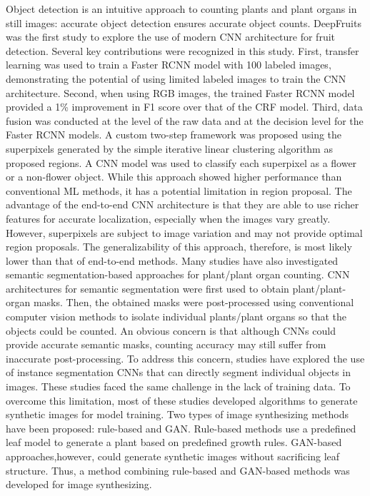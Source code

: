Object detection is an intuitive approach to counting plants and plant organs in still images: accurate object detection ensures accurate object counts.
DeepFruits was the first study to explore the use of modern CNN architecture for fruit detection. Several key contributions were recognized in this study.
First, transfer learning was used to train a Faster RCNN model with 100 labeled images, demonstrating the potential of using limited labeled images to train the CNN
architecture. Second, when using RGB images, the trained Faster RCNN model provided a 1\% improvement in F1 score over that of the CRF model. Third, data fusion was
conducted at the level of the raw data and at the decision level for the Faster RCNN models. A custom two-step framework was proposed using the superpixels generated
by the simple iterative linear clustering algorithm as proposed regions. A CNN model was used to classify each superpixel as a flower or a non-flower object. While
this approach showed higher performance than conventional ML methods, it has a potential limitation in region proposal. The advantage of the end-to-end CNN architecture
is that they are able to use richer features for accurate localization, especially when the images vary greatly. However, superpixels are subject to image variation and
may not provide optimal region proposals. The generalizability of this approach, therefore, is most likely lower than that of end-to-end methods.
Many studies have also investigated semantic segmentation-based approaches for plant/plant organ counting. CNN architectures for semantic segmentation were first used to
obtain plant/plant-organ masks. Then, the obtained masks were post-processed using conventional computer vision methods to isolate individual plants/plant organs so that
the objects could be counted. An obvious concern is that although CNNs could provide accurate semantic masks, counting accuracy may still suffer from inaccurate
post-processing. To address this concern, studies have explored the use of instance segmentation CNNs that can directly segment individual objects in images. These
studies faced the same challenge in the lack of training data. To overcome this limitation, most of these studies developed algorithms to generate synthetic images for
model training. Two types of image synthesizing methods have been proposed: rule-based and GAN. Rule-based methods use a predefined leaf model to generate a plant based
on predefined growth rules. GAN-based approaches,however, could generate synthetic images without sacrificing leaf structure. Thus, a method combining rule-based and
GAN-based methods was developed for image synthesizing.

